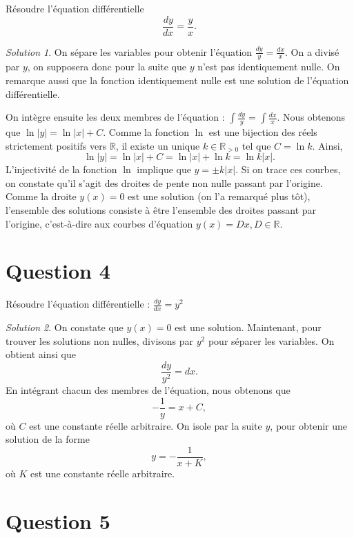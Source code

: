 \documentclass[
  12pt,
  letterpaper,
]{book}
\theoremstyle{remark}
\newtheorem*{solution}{Solution}
\begin{document}
Résoudre l'équation différentielle \[\frac{dy}{dx} = \frac{y}{x}.\]

\begin{solution}

On sépare les variables pour obtenir l'équation
\(\frac{dy}{y} = \frac{dx}{x}\). On a divisé par \(y\), on supposera
donc pour la suite que \(y\) n'est pas identiquement nulle. On remarque
aussi que la fonction identiquement nulle est une solution de l'équation
différentielle.

On intègre ensuite les deux membres de l'équation :
\(\int \frac{dy}{y} = \int \frac{dx}{x}\). Nous obtenons que
\(\ln|y| = \ln|x| + C\). Comme la fonction \(\ln\) est une bijection des
réels strictement positifs vers \(\mathbb{R}\), il existe un unique
\(k\in\mathbb{R}_{>0}\) tel que \(C=\ln k\). Ainsi,
\[\ln|y| = \ln|x| + C=\ln|x| + \ln k=\ln k|x|.\] L'injectivité de la
fonction \(\ln\) implique que \(y=\pm k|x|\). Si on trace ces courbes,
on constate qu'il s'agit des droites de pente non nulle passant par
l'origine. Comme la droite \(y(x)=0\) est une solution (on l'a remarqué
plus tôt), l'ensemble des solutions consiste à être l'ensemble des
droites passant par l'origine, c'est-à-dire aux courbes d'équation
\(y(x)=Dx, D\in\mathbb{R}\).

\end{solution}

\hypertarget{question-4-4}{%
\section{Question 4}\label{question-4-4}}

Résoudre l'équation différentielle : \(\frac{dy}{dx} = y^2\)

\begin{solution}

On constate que \(y(x)=0\) est une solution. Maintenant, pour trouver
les solutions non nulles, divisons par \(y^2\) pour séparer les
variables. On obtient ainsi que \[\frac{dy}{y^2} = dx.\] En intégrant
chacun des membres de l'équation, nous obtenons que
\[-\frac{1}{y} = x + C,\] où \(C\) est une constante réelle arbitraire.
On isole par la suite \(y\), pour obtenir une solution de la forme
\[y = -\frac{1}{x + K},\] où \(K\) est une constante réelle arbitraire.

\end{solution}

\hypertarget{question-5-4}{%
\section{Question 5}\label{question-5-4}}
\end{document}
